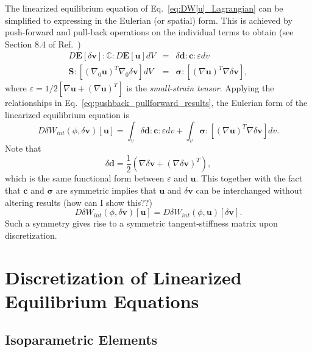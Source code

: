 \documentclass[12pt,aps,pre]{revtex4}
\begin{document}
The linearized equilibrium equation of Eq.\ \eqref{eq:DW[u]_Lagrangian} can be simplified to expressing in the Eulerian (or spatial) form. This is achieved by push-forward and pull-back operations on the individual terms to obtain (see Section 8.4 of Ref.\ )
%
\begin{eqnarray}
D\pmb{E}[\delta\pmb{v}] :\pmb{\mathbb{C}}:D\pmb{E}[\pmb{u}]dV &=& \delta \pmb{d}:\pmb{c}:\varepsilon dv \nonumber\\
%
\pmb{S}: [(\nabla_0 \pmb{u})^T \nabla_0\delta \pmb{v}]dV &=& \pmb{\sigma}:[(\nabla \pmb{u})^T\nabla \delta \pmb{v}],
\label{eq:pushback_pullforward_results}
\end{eqnarray}
%
where $\varepsilon = 1/2[\nabla \pmb{u} + (\nabla \pmb{u})^T]$ is the \textit{small-strain tensor}. Applying the relationships in Eq.\ \eqref{eq:pushback_pullforward_results}, the Eulerian form of the linearized equilibrium equation is
%
\begin{equation}
D\delta W_{int}(\phi,\delta \pmb{v})[\pmb{u}] = \int_v \delta \pmb{d}:\pmb{c}:\varepsilon dv + \int_v \pmb{\sigma}:[(\nabla \pmb{u})^T\nabla \delta \pmb{v}]dv.
\label{eq:DW[u]_Eulerian}
\end{equation}
%
Note that 
%
\begin{equation}
\delta \pmb{d} = \frac{1}{2}(\nabla \delta \pmb{v} + (\nabla \delta \pmb{v})^T),
\end{equation}
%
which is the same functional form between $\varepsilon$ and $\pmb{u}$. This together with the fact that $\pmb{c}$ and $\pmb{\sigma}$ are symmetric implies that $\pmb{u}$ and $\delta \pmb{v}$ can be interchanged without altering results (how can I show this??)
%
\begin{equation}
D\delta W_{int}(\phi,\delta \pmb{v})[\pmb{u}] = D\delta W_{int}(\phi,\pmb{u})[\delta \pmb{v}] .
\end{equation}
%
Such a symmetry gives rise to a symmetric tangent-stiffness matrix upon discretization.

\section{Discretization of Linearized Equilibrium Equations}

\subsection{Isoparametric Elements}
\end{document}
